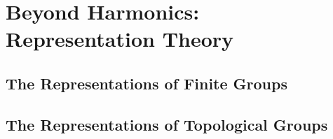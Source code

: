 \chapter[Beyond Harmonics: Representation Theory]{Beyond Harmonics:\\ Representation Theory}

\section{The Representations of Finite Groups} %
\label{sec:the_representations_of_finite_groups}


\section{The Representations of Topological Groups} %
\label{sec:the_representations_of_topological_groups}

